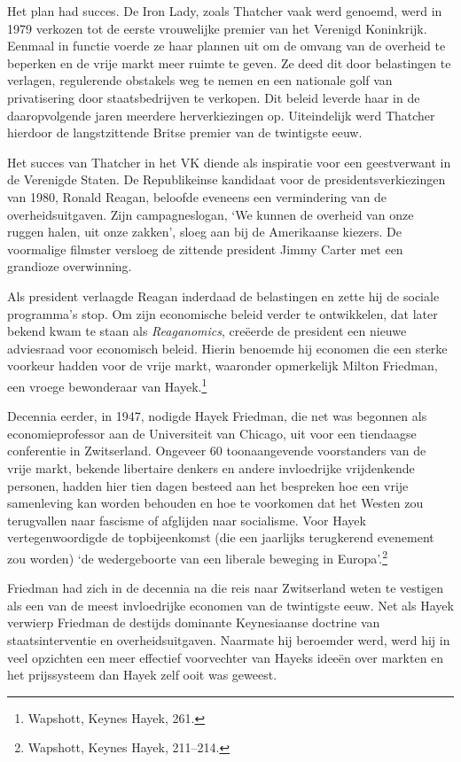 \documentclass[
  a5paper,
  smalldemyvopaper,11pt,twoside,onecolumn,openright,extrafontsizes,
hidelinks]{memoir}
\begin{document}
Het plan had succes. De Iron Lady, zoals Thatcher vaak werd genoemd,
werd in 1979 verkozen tot de eerste vrouwelijke premier van het Verenigd
Koninkrijk. Eenmaal in functie voerde ze haar plannen uit om de omvang
van de overheid te beperken en de vrije markt meer ruimte te geven. Ze
deed dit door belastingen te verlagen, regulerende obstakels weg te
nemen en een nationale golf van privatisering door staatsbedrijven te
verkopen. Dit beleid leverde haar in de daaropvolgende jaren meerdere
herverkiezingen op. Uiteindelijk werd Thatcher hierdoor de
langstzittende Britse premier van de twintigste eeuw.

Het succes van Thatcher in het VK diende als inspiratie voor een
geestverwant in de Verenigde Staten. De Republikeinse kandidaat voor de
presidentsverkiezingen van 1980, Ronald Reagan, beloofde eveneens een
vermindering van de overheidsuitgaven. Zijn campagneslogan, `We kunnen
de overheid van onze ruggen halen, uit onze zakken', sloeg aan bij de
Amerikaanse kiezers. De voormalige filmster versloeg de zittende
president Jimmy Carter met een grandioze overwinning.

Als president verlaagde Reagan inderdaad de belastingen en zette hij de
sociale programma's stop. Om zijn economische beleid verder te
ontwikkelen, dat later bekend kwam te staan als \emph{Reaganomics},
creëerde de president een nieuwe adviesraad voor economisch beleid.
Hierin benoemde hij economen die een sterke voorkeur hadden voor de
vrije markt, waaronder opmerkelijk Milton Friedman, een vroege
bewonderaar van Hayek.\footnote{Wapshott, Keynes Hayek, 261.}

Decennia eerder, in 1947, nodigde Hayek Friedman, die net was begonnen
als economieprofessor aan de Universiteit van Chicago, uit voor een
tiendaagse conferentie in Zwitserland. Ongeveer 60 toonaangevende
voorstanders van de vrije markt, bekende libertaire denkers en andere
invloedrijke vrijdenkende personen, hadden hier tien dagen besteed aan
het bespreken hoe een vrije samenleving kan worden behouden en hoe te
voorkomen dat het Westen zou terugvallen naar fascisme of afglijden naar
socialisme. Voor Hayek vertegenwoordigde de topbijeenkomst (die een
jaarlijks terugkerend evenement zou worden) `de wedergeboorte van een
liberale beweging in Europa'.\footnote{Wapshott, Keynes Hayek, 211--214.}

Friedman had zich in de decennia na die reis naar Zwitserland weten te
vestigen als een van de meest invloedrijke economen van de twintigste
eeuw. Net als Hayek verwierp Friedman de destijds dominante Keynesiaanse
doctrine van staatsinterventie en overheidsuitgaven. Naarmate hij
beroemder werd, werd hij in veel opzichten een meer effectief
voorvechter van Hayeks ideeën over markten en het prijssysteem dan Hayek
zelf ooit was geweest.
\end{document}
